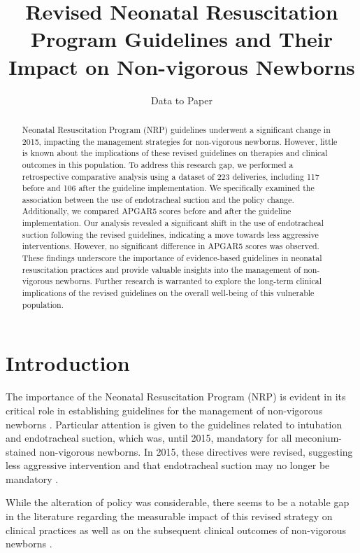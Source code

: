 \documentclass[11pt]{article}
\title{Revised Neonatal Resuscitation Program Guidelines and Their Impact on Non-vigorous Newborns}
\author{Data to Paper}
\begin{document}
\maketitle
\begin{abstract}Neonatal Resuscitation Program (NRP) guidelines underwent a significant change in 2015, impacting the management strategies for non-vigorous newborns. However, little is known about the implications of these revised guidelines on therapies and clinical outcomes in this population. To address this research gap, we performed a retrospective comparative analysis using a dataset of 223 deliveries, including 117 before and 106 after the guideline implementation. We specifically examined the association between the use of endotracheal suction and the policy change. Additionally, we compared APGAR5 scores before and after the guideline implementation. Our analysis revealed a significant shift in the use of endotracheal suction following the revised guidelines, indicating a move towards less aggressive interventions. However, no significant difference in APGAR5 scores was observed. These findings underscore the importance of evidence-based guidelines in neonatal resuscitation practices and provide valuable insights into the management of non-vigorous newborns. Further research is warranted to explore the long-term clinical implications of the revised guidelines on the overall well-being of this vulnerable population.\end{abstract}
\section*{Introduction}

The importance of the Neonatal Resuscitation Program (NRP) is evident in its critical role in establishing guidelines for the management of non-vigorous newborns \cite{Simas2011ImpactOU}. Particular attention is given to the guidelines related to intubation and endotracheal suction, which was, until 2015, mandatory for all meconium-stained non-vigorous newborns. In 2015, these directives were revised, suggesting less aggressive intervention and that endotracheal suction may no longer be mandatory \cite{Adams2003GuidelinesFT}.

While the alteration of policy was considerable, there seems to be a notable gap in the literature regarding the measurable impact of this revised strategy on clinical practices as well as on the subsequent clinical outcomes of non-vigorous newborns \cite{Adams2003GuidelinesFT, Raghu2015AnOA}.
\end{document}
